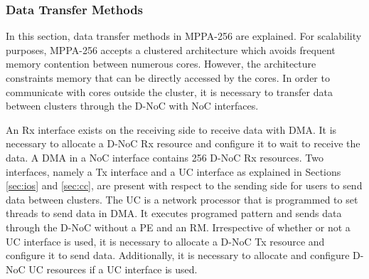 \documentclass[conference,compsoc]{IEEEtran}
\newcommand{\comment}[1]{}
\begin{document}
\vspace{-3mm}
\subsubsection{Data Transfer Methods}
\label{sec:data_transfer_methods}

\comment{TBD: 1-19: To be fully refleshed, Add setup and approach}
In this section, data transfer methods in MPPA-256 are explained.
For scalability purposes, MPPA-256 accepts a clustered architecture which avoids frequent memory contention between numerous cores.
However, the architecture constraints memory that can be directly accessed by the cores.
In order to communicate with cores outside the cluster, it is necessary to transfer data between clusters through the D-NoC with NoC interfaces.

An Rx interface exists on the receiving side to receive data with DMA.
It is necessary to allocate a D-NoC Rx resource and configure it to wait to receive the data.
A DMA in a NoC interface contains 256 D-NoC Rx resources.
Two interfaces, namely a Tx interface and a UC interface as explained in Sections \ref{sec:ios} and \ref{sec:cc},
are present with respect to the sending side for users to send data between clusters.
The UC is a network processor that is programmed to set threads to send data in DMA.
It executes programed pattern and sends data through the D-NoC without a PE and an RM.
Irrespective of whether or not a UC interface is used, it is necessary to allocate a D-NoC Tx resource and configure it to send data.
Additionally, it is necessary to allocate and configure D-NoC UC resources if a UC interface is used.
\end{document}
